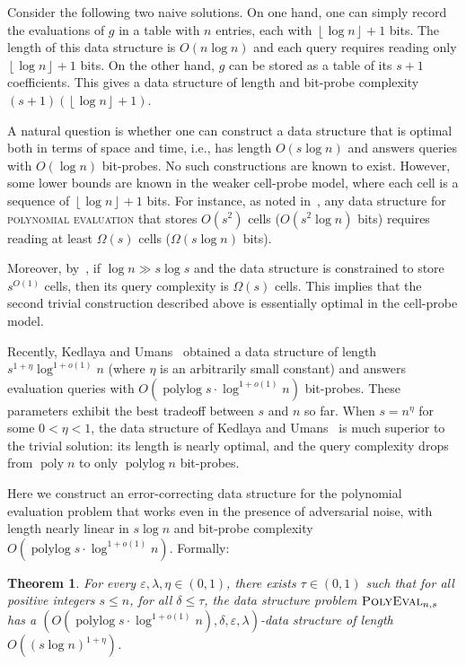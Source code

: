 \documentclass[11pt,english]{article}
\newcommand{\noun}[1]{\textsc{#1}}
\newtheorem{theorem}{Theorem}
\theoremstyle{definition}
\theoremstyle{remark}
\newcommand{\eps}{\varepsilon}
\newcommand{\polyn}{\operatorname{poly}}
\newcommand{\polylog}{\operatorname{polylog} }
\newcommand{\polyeval}{\mbox{\textsc{PolyEval}}}
\begin{document}
Consider the following two naive solutions. On one hand, one can simply
record the evaluations of $g$ in a table with $n$ entries, each
with $\left\lfloor \log n\right\rfloor +1$ bits. The length of this
data structure is $O(n\log n)$ and each query requires reading only
$\left\lfloor \log n\right\rfloor +1$ bits. On the other hand, 
$g$ can be stored as a table of its $s+1$ coefficients. This gives a data structure of
length and bit-probe complexity $(s+1)(\left\lfloor \log n\right\rfloor +1)$. 

A natural question is whether one can construct a data structure that
is optimal both in terms of space and time, i.e., has length $O(s\log n)$
and answers queries with $O(\log n)$ bit-probes. No such constructions
are known to exist. However, some lower bounds are known in the weaker
cell-probe model, where each cell is a sequence of $\left\lfloor \log n\right\rfloor +1$
bits. For instance, as noted in~\cite{miltersen:cellprobesurvey},
any data structure for  \noun{polynomial evaluation} that stores $O(s^{2})$
cells ($O(s^{2}\log n)$ bits) requires reading at least $\Omega(s)$
cells ($\Omega(s\log n)$ bits). \begin{comment}
info above from Miltersen survey pg 17 para 2
\end{comment}
 Moreover, by~\cite{miltersen95polyeval}, if $\log n\gg s\log s$
and the data structure is constrained to store $s^{O(1)}$ cells,
then its query complexity is $\Omega(s)$ cells. This implies that
the second trivial construction described above is essentially optimal in the cell-probe model.

Recently, Kedlaya and Umans~\cite{kedl-umans} obtained a data structure
of length $s^{1+\eta}\log^{1+o(1)}n$ (where $\eta$ is an arbitrarily
small constant) and answers evaluation queries with $O(\polylog s\cdot\log^{1+o(1)}n)$
bit-probes. These parameters exhibit the best tradeoff
between $s$ and $n$ so far. When $s=n^{\eta}$ for some $0<\eta<1$,
the data structure of Kedlaya and Umans~\cite{kedl-umans} is much superior
to the trivial solution: its length is nearly optimal, and the query complexity
drops from $\polyn n$ to only $\polylog n$ bit-probes.

Here we construct an error-correcting data structure for the polynomial
evaluation problem that works even in the presence of adversarial noise,
with length nearly linear in $s\log n$ and bit-probe complexity $O(\polylog s\cdot\log^{1+o(1)}n)$. Formally:

\begin{theorem}\label{thm:poly eval} For every $\eps,\lambda,\eta\in(0,1)$,
there exists $\tau\in(0,1)$ such that for all positive integers $s\leq n$,
for all $\delta\leq\tau$, the data structure problem $\polyeval_{n,s}$
has a $(O(\polylog s\cdot\log^{1+o(1)}n),\delta,\eps,\lambda)$-data structure 
of length $O((s\log n)^{1+\eta})$. 
\end{theorem}
\end{document}
